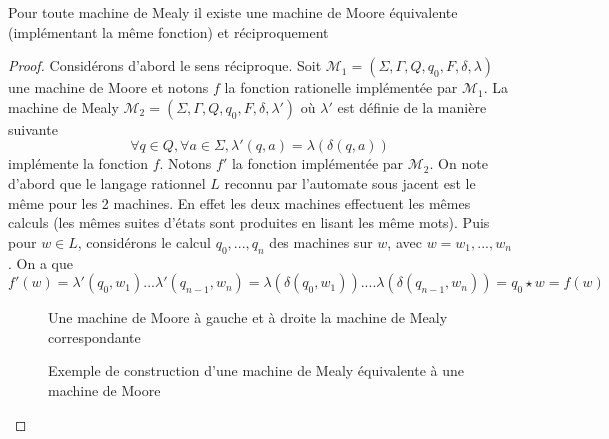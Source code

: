 \documentclass{scrartcl}
\begin{document}
\begin{flushleft}
\begin{theorem}
    Pour toute machine de Mealy il existe une machine de Moore équivalente (implémentant la même fonction) et réciproquement
\end{theorem}

\begin{proof}
    Considérons d'abord le sens réciproque. Soit $\mathcal{M}_1 = (\Sigma, \Gamma, Q, q_0, F, \delta, \lambda)$ une machine de Moore et notons $f$ la
    fonction rationelle implémentée par $\mathcal{M}_1$. La machine de Mealy $\mathcal{M}_2 = (\Sigma, \Gamma, Q, q_0, F, \delta, \lambda')$ où
    $\lambda'$ est définie de la manière suivante
    \[ \forall q \in Q, \forall a \in \Sigma, \lambda'(q, a) = \lambda(\delta(q, a)) \]
    implémente la fonction $f$. Notons $f'$ la fonction implémentée par $\mathcal{M}_2$. On note d'abord que le langage rationnel $L$ reconnu par l'automate
    sous jacent est le même pour les 2 machines. En effet les deux machines effectuent les mêmes calculs (les mêmes suites d'états sont produites
    en lisant les même mots). Puis pour $w \in L$, considérons le calcul $q_0, ..., q_n$ des machines sur $w$, avec $w = w_1, ..., w_n$. On a que
    \[ f'(w) = \lambda'(q_0, w_1) ... \lambda'(q_{n-1}, w_n) = \lambda(\delta(q_0, w_1)) .... \lambda(\delta(q_{n-1}, w_n)) = q_0 \star w = f(w) \]
    \begin{figure}[h]
        \caption{Exemple de construction d'une machine de Mealy équivalente à une machine de Moore}
        \begin{center}
        Une machine de Moore à gauche et à droite la machine de Mealy correspondante
        \end{center}
    \end{figure}


\end{proof}
\end{flushleft}
\end{document}
